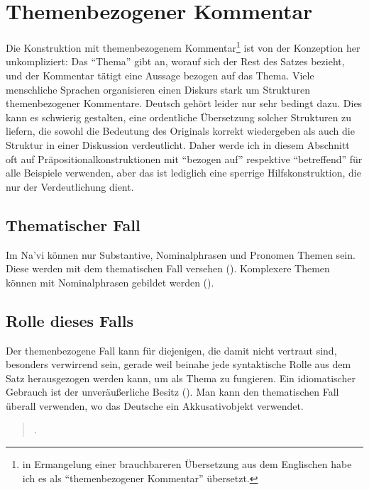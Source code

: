 

\section{Themenbezogener Kommentar}
\label{pragma:topic-comment}

\noindent Die Konstruktion mit themenbezogenem Kommentar\footnote{in Ermangelung
einer brauchbareren \"Ubersetzung aus dem Englischen habe ich es als "`themenbezogener
Kommentar"' \"ubersetzt.} ist von der Konzeption her unkompliziert: Das "`Thema"'
gibt an, worauf sich der Rest des Satzes bezieht, und der Kommentar t\"atigt eine
Aussage bezogen auf das Thema. Viele menschliche Sprachen organisieren einen
Diskurs stark um Strukturen themenbezogener Kommentare. Deutsch geh\"ort leider
nur sehr bedingt dazu.
Dies kann es schwierig gestalten, eine ordentliche \"Ubersetzung solcher Strukturen
zu liefern, die sowohl die Bedeutung des Originals korrekt wiedergeben als auch die
Struktur in einer Diskussion verdeutlicht.
Daher werde ich in diesem Abschnitt oft auf Pr\"apositionalkonstruktionen mit "`bezogen
auf"' respektive "`betreffend"' f\"ur alle Beispiele verwenden, aber das ist lediglich
eine sperrige Hilfskonstruktion, die nur der Verdeutlichung dient.

\subsection{Thematischer Fall} Im Na’vi k\"onnen nur Substantive, Nominalphrasen und
Pronomen Themen sein. Diese werden mit dem thematischen Fall versehen ().
Komplexere Themen k\"onnen mit Nominalphrasen gebildet werden ().

\subsection{Rolle dieses Falls} Der themenbezogene Fall kann f\"ur diejenigen, die damit
nicht vertraut sind, besonders verwirrend sein, gerade weil beinahe jede syntaktische
Rolle aus dem Satz herausgezogen werden kann, um als Thema zu fungieren. Ein idiomatischer
Gebrauch ist der unver\"au\ss{}erliche Besitz (). Man kann
den thematischen Fall \"uberall verwenden, wo das Deutsche ein Akkusativobjekt verwendet.

\begin{quotation}
\noindent{}

\medskip
\noindent{}.
\end{quotation}

